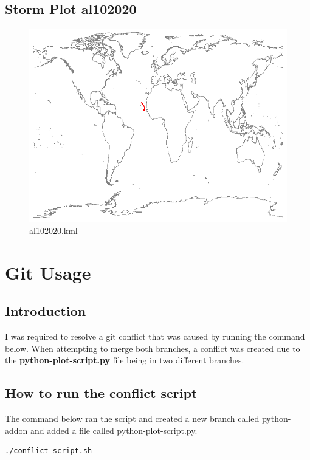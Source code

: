 \documentclass[]{article}
\begin{document}
\clearpage
\subsection{Storm Plot al102020}

\begin{figure}[htbp]
    \centering
\includegraphics{al102020.png}
\caption{al102020.kml}
\label{fig:al102020}
\end{figure}
\clearpage



\section{Git Usage}
\subsection{Introduction}
I was required to resolve a git conflict that was caused by running the command below. When attempting to merge both branches,
a conflict was created due to the \textbf{python-plot-script.py} file being in two different branches.

\subsection{How to run the conflict script}
The command below ran the script and created a new branch called python-addon and added a file called python-plot-script.py.
\begin{tcolorbox}[colback=white, colframe=black, boxrule=1pt, arc=2mm, 
    fonttitle=\bfseries, listing only, listing options={language=sh, basicstyle=\ttfamily}]
\begin{verbatim}
./conflict-script.sh
\end{verbatim}
\end{tcolorbox}
\end{document}
